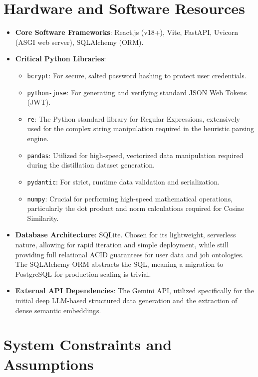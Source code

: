 \documentclass[12pt,a4paper]{report}
\begin{document}
\section{Hardware and Software Resources}

\begin{itemize}
    \item \textbf{Core Software Frameworks}: React.js (v18+), Vite, FastAPI, Uvicorn (ASGI web server), SQLAlchemy (ORM).
    \item \textbf{Critical Python Libraries}: 
    \begin{itemize}
        \item \texttt{bcrypt}: For secure, salted password hashing to protect user credentials.
        \item \texttt{python-jose}: For generating and verifying standard JSON Web Tokens (JWT).
        \item \texttt{re}: The Python standard library for Regular Expressions, extensively used for the complex string manipulation required in the heuristic parsing engine.
        \item \texttt{pandas}: Utilized for high-speed, vectorized data manipulation required during the distillation dataset generation.
        \item \texttt{pydantic}: For strict, runtime data validation and serialization.
        \item \texttt{numpy}: Crucial for performing high-speed mathematical operations, particularly the dot product and norm calculations required for Cosine Similarity.
    \end{itemize}
    \item \textbf{Database Architecture}: SQLite. Chosen for its lightweight, serverless nature, allowing for rapid iteration and simple deployment, while still providing full relational ACID guarantees for user data and job ontologies. The SQLAlchemy ORM abstracts the SQL, meaning a migration to PostgreSQL for production scaling is trivial.
    \item \textbf{External API Dependencies}: The Gemini API, utilized specifically for the initial deep LLM-based structured data generation and the extraction of dense semantic embeddings.
\end{itemize}

\section{System Constraints and Assumptions}
\end{document}
